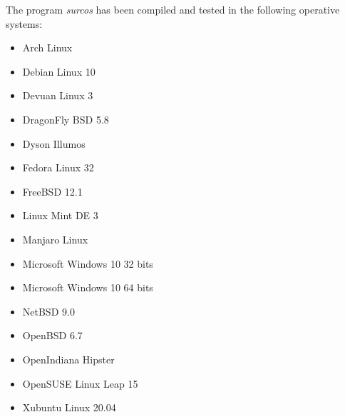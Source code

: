 The program \emph{surcos} has been compiled and tested in the following
operative systems:
\begin{itemize}
\item Arch Linux
\item Debian Linux 10
\item Devuan Linux 3
\item DragonFly BSD 5.8
\item Dyson Illumos
\item Fedora Linux 32
\item FreeBSD 12.1
\item Linux Mint DE 3
\item Manjaro Linux
\item Microsoft Windows 10 32 bits
\item Microsoft Windows 10 64 bits
\item NetBSD 9.0
\item OpenBSD 6.7
\item OpenIndiana Hipster
\item OpenSUSE Linux Leap 15
\item Xubuntu Linux 20.04
\end{itemize}
